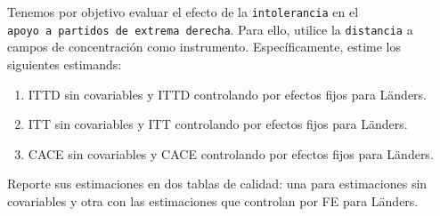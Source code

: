 \documentclass[
  12pt,
  a4paper,
]{article}
\providecommand{\tightlist}{%
  \setlength{\itemsep}{0pt}\setlength{\parskip}{0pt}}
\begin{document}
Tenemos por objetivo evaluar el efecto de la \texttt{intolerancia} en el \texttt{apoyo\ a\ partidos\ de\ extrema\ derecha}. Para ello, utilice la \texttt{distancia} a campos de concentración como instrumento. Específicamente, estime los siguientes estimands:

\begin{enumerate}
\def\labelenumi{\alph{enumi})}
\tightlist
\item
  ITTD sin covariables y ITTD controlando por efectos fijos para Länders.
\item
  ITT sin covariables y ITT controlando por efectos fijos para Länders.
\item
  CACE sin covariables y CACE controlando por efectos fijos para Länders.
\end{enumerate}

Reporte sus estimaciones en dos tablas de calidad: una para estimaciones sin covariables y otra con las estimaciones que controlan por FE para Länders.

\begin{table}[h!]
\begin{center}
\caption{\label{tab:table1} Modelos de VI sin efectos fijos para apoyo a partidos de extrema derecha en base a Pepinsky et al. (2023)}
\label{table:coefficients}
\end{center}
\end{table}
\end{document}
